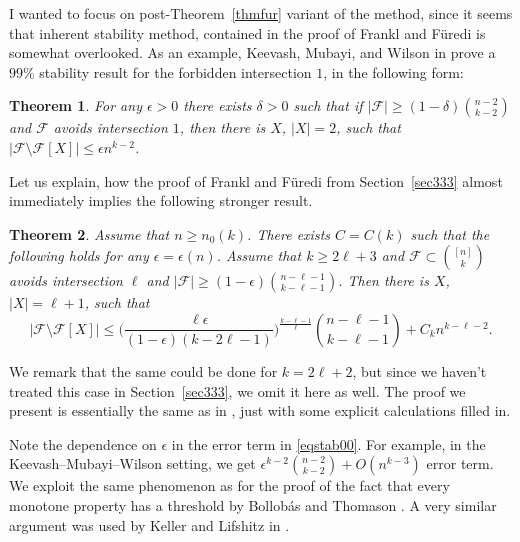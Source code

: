 \documentclass[graybox]{svmult}
\renewcommand{\le}{\leqslant}
\renewcommand{\ge}{\geqslant}
\newcommand{\ff}{\mathcal{F}}
\newtheorem{thm}{Theorem}
\begin{document}
I wanted to focus on post-Theorem~\ref{thmfur} variant of the method, since it seems that inherent stability method, contained in the proof of Frankl and F\"uredi \cite{FF1} is somewhat overlooked.  As an example, Keevash, Mubayi, and Wilson in \cite{KMW} prove a $99\%$ stability result for the forbidden intersection $1$, in the following form:
\begin{thm} For any $\epsilon>0$ there exists $\delta>0$ such that if $|\ff|\ge(1-\delta) {n-2\choose k-2}$ and $\ff$ avoids intersection $1$, then there is $X$, $|X|=2$, such that $|\ff\setminus \ff[X]|\le \epsilon n^{k-2}$.
\end{thm}


Let us explain, how the proof of Frankl and F\"uredi from Section~\ref{sec333} almost immediately implies the following stronger result.

\begin{thm}\label{thmstab} Assume that $n\ge n_0(k)$. There exists $C = C(k)$ such that the following holds for any $\epsilon =\epsilon(n)$. Assume that $k\ge 2\ell+3$ and $\ff\subset {[n]\choose k}$ avoids intersection $\ell$ and $|\ff|\ge (1-\epsilon){n-\ell-1\choose k-\ell-1}$. Then there is $X$, $|X|=\ell+1$, such that \begin{equation}\label{eqstab00}|\ff\setminus \ff[X]|\le \Big(\frac{\ell\epsilon}{(1-\epsilon)(k-2\ell-1)}\Big)^{\frac{k-\ell-1}\ell} {n-\ell-1\choose k-\ell-1}+C_k n^{k-\ell-2}.\end{equation}
\end{thm}
We remark that the same could be done for $k=2\ell+2$, but since we haven't treated this case in Section~\ref{sec333}, we omit it here as well.
The proof we present is essentially the same as in \cite{FF1}, just with some explicit calculations filled in.

Note the dependence on $\epsilon$ in the error term in \eqref{eqstab00}. For example, in the Keevash--Mubayi--Wilson setting, we get $\epsilon^{k-2}{n-2\choose k-2}+O(n^{k-3})$ error term. We exploit the same phenomenon as for the proof of the fact that every monotone property has a threshold by Bollob\'as and Thomason \cite{BT}. A very similar argument was used by Keller and Lifshitz in \cite{KL}.
\end{document}
